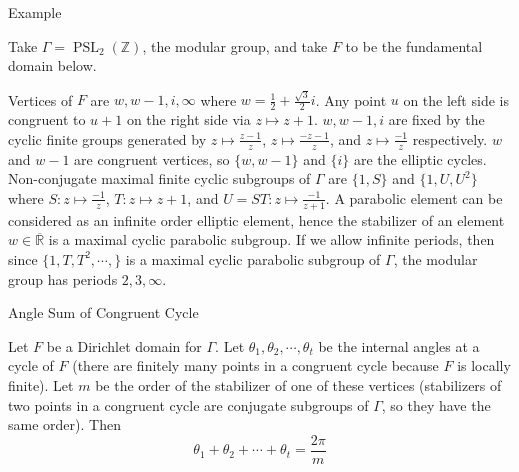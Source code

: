 \documentclass[
	american,
	sections numbered,
	usenames,
	xcolor=dvipsnames,
	aspectratio=169,
]{beamer}
\DeclareMathOperator{\PSL}{PSL}
\theoremstyle{plain}%
\begin{document}
\begin{frame}{Example}

    Take $\Gamma=\PSL_2(\mathbb{Z})$, the modular group, and take $F$ to be the fundamental domain below.

    \begin{minipage}{0.24\textwidth}
		\begin{center}
        \end{center}
	\end{minipage}
	\begin{minipage}{0.75\textwidth}
		Vertices of $F$ are $w,w-1,i,\infty$ where $w=\frac{1}{2}+\frac{\sqrt{3}}{2}i$. Any point $u$ on the left side is congruent to $u+1$ on the right side via $z\mapsto z+1$. $w,w-1,i$ are fixed by the cyclic finite groups generated by $z\mapsto\frac{z-1}{z}$, $z\mapsto\frac{-z-1}{z}$, and $z\mapsto\frac{-1}{z}$ respectively. $w$ and $w-1$ are congruent vertices, so $\{w,w-1\}$ and $\{i\}$ are the elliptic cycles. Non-conjugate maximal finite cyclic subgroups of $\Gamma$ are $\{1,S\}$ and $\{1,U,U^2\}$ where $S:z\mapsto \frac{-1}{z}$, $T:z\mapsto z+1$, and $U=ST:z\mapsto \frac{-1}{z+1}$. A parabolic element can be considered as an infinite order elliptic element, hence the stabilizer of an element $w\in\overline{\mathbb{R}}$ is a maximal cyclic parabolic subgroup. If we allow infinite periods, then since $\{1,T,T^2,\cdots,\}$ is a maximal cyclic parabolic subgroup of $\Gamma$, the modular group has periods $2,3,\infty$.
	\end{minipage}
    
\end{frame}

\begin{frame}{Angle Sum of Congruent Cycle}

	\begin{theorem}\label<1>{thm:2pim}
    Let $F$ be a Dirichlet domain for $\Gamma$. Let $\theta_1,\theta_2,\cdots,\theta_t$ be the internal angles at a cycle of $F$ (there are finitely many points in a congruent cycle because $F$ is locally finite). Let $m$ be the order of the stabilizer of one of these vertices (stabilizers of two points in a congruent cycle are conjugate subgroups of $\Gamma$, so they have the same order). Then $$\theta_1+\theta_2+\cdots+\theta_t=\frac{2\pi}{m}$$
    \end{theorem}

\end{frame}
\end{document}
